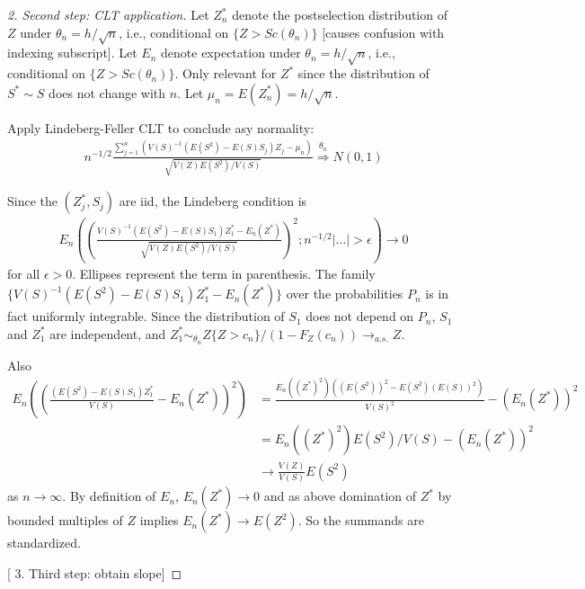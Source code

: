 \documentclass{article}
\newcommand{\E}{E}
\renewcommand{\P}{P}
\newcommand{\V}{V}
\newcommand{\sel}[1]{#1^*}
\begin{document}
\begin{proof}
  [2. Second step: CLT application]

  Let $\sel Z_n$ denote the postselection distribution of $Z$ under $\theta_n=h/\sqrt{n}$, i.e., conditional on $\{Z>Sc(\theta_n)\}$ [causes confusion with indexing subscript]. Let $E_n$ denote expectation under $\theta_n=h/\sqrt{n}$, i.e., conditional on $\{Z>Sc(\theta_n)\}$. Only relevant for $\sel Z$ since the distribution of $\sel S\sim S$ does not change with $n$.  Let  $\mu_n=\E(\sel Z_n)=h/\sqrt{n}$.

  Apply Lindeberg-Feller CLT to conclude asy normality:
  \begin{align}
    n^{-1/2}\frac{\sum_{j=1}^n\left(\V(S)^{-1}(\E(S^2)-\E(S)S_j)Z_j-\mu_n\right)}{\sqrt{\V(Z)\E(S^2)/\V(S)}} \overset{\theta_n}{\Rightarrow} N(0,1)
  \end{align}
  
  Since the $(\sel Z_j,S_j)$ are iid, the Lindeberg condition is
  \begin{align}
    \E_n\left(\left( \frac{\V(S)^{-1}(\E(S^2)-\E(S)S_1)\sel{Z_1}-\E_n(\sel Z)}{\sqrt{\V(Z)\E(S^2)/\V(S)}}  \right)^2; n^{-1/2}|\ldots|>\epsilon\right) \to 0
  \end{align}
  for all $\epsilon>0$. Ellipses represent the term in parenthesis. The family $\{\V(S)^{-1}(\E(S^2)-\E(S)S_1)\sel{Z_1}-\E_n(\sel Z)\}$ over the probabilities $\P_n$ is in fact uniformly integrable. Since the distribution of $S_1$ does not depend on $\P_n$, $S_1$ and $\sel Z_1$ are independent, and $\sel Z_1 \sim_{\theta_n} Z\{Z>c_n\}/(1-F_Z(c_n)) \to_{a.s.} Z$.


  Also
  \begin{align}
    \E_n\left(\left(\frac{(\E(S^2)-\E(S)S_1)\sel Z_1}{\V(S)} -\E_n(\sel Z)  \right)^2\right) &= \frac{\E_n((\sel Z)^2)((\E(S^2))^2-\E(S^2)(\E(S))^2)}{\V(S)^2} - (\E_n(\sel Z))^2\\
                                                                                             &= \E_n((\sel Z)^2)\E(S^2)/\V(S) - (\E_n(\sel Z))^2\\
                                                                                             &\rightarrow \frac{\V(Z)}{\V(S)}\E(S^2)
  \end{align}
  as $n\to\infty$. By definition of $E_n$, $\E_n(\sel Z)\to 0$ and as
  above domination of $\sel Z$ by bounded multiples of $Z$ implies
  $\E_n(\sel Z)\to \E(Z^2)$. So the summands are standardized.

  [  3. Third step: obtain slope]
  

\end{proof}
\end{document}
